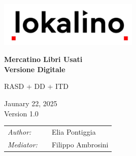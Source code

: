 
\begin{titlepage}
    \begin{center}
        \includegraphics[width=0.5\textwidth]{assets/logo.png}

        \vspace*{2cm}
        \textbf{\huge Mercatino Libri Usati}\\
        \vspace{0.5cm}
        \textbf{\huge Versione Digitale}

        \vspace{0.5cm}
        \LARGE RASD + DD + ITD

        \vspace{1.5cm}

        \vspace{0.5cm}
        Jaunary 22, 2025\\
        Version 1.0

        \vspace{1cm}
        \small
        \begin{table}[b]
            \centering
            \begin{tabular}{l p{.5cm} l}
                \textit{Author:}   &  & Elia Pontiggia    \\
                \textit{Mediator:} &  & Filippo Ambrosini
            \end{tabular}
        \end{table}

    \end{center}
\end{titlepage}